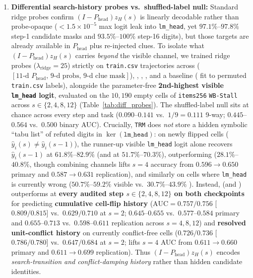 \documentclass[10pt,letterpaper]{article}
\newcommand{\Phead}{P_{\mathrm{head}}}
\begin{document}
\begin{enumerate}[topsep=3pt,itemsep=2pt]
  \item \textbf{Differential search-history probes vs.\ shuffled-label null:} Standard ridge probes confirm $(I-\Phead)z_H(s)$ is linearly decodable rather than probe-opaque ($<1.5\times 10^{-5}$ max logit leak into \texttt{lm\_head}, yet $97.1\%$--$97.8\%$ step-1 candidate masks and $93.5\%$--$100\%$ step-16 digits), but those targets are already available in $\Phead$ plus re-injected clues. To isolate what $(I-\Phead)z_H(s)$ carries \emph{beyond} the visible channel, we trained ridge probes ($\lambda_{\mathrm{ridge}}=25$) strictly on \texttt{train.csv} trajectories across  ($[11\text{-d }\Phead,\, 9\text{-d probs},\, 9\text{-d clue mask}]$), , , , and a  baseline ( fit to permuted \texttt{train.csv} labels), alongside the parameter-free \textbf{2nd-highest visible \texttt{lm\_head} logit}, evaluated on the $10{,}190$ empty cells of \texttt{items256} \texttt{WB-Stall} across $s \in \{2, 4, 8, 12\}$ (Table~\ref{tab:diff_probes}). The shuffled-label null sits at chance across every step and task ($0.090$--$0.141$ vs.\ $1/9=0.111$ 9-way; $0.445$--$0.564$ vs.\ $0.500$ binary AUC). Crucially, \texttt{TRM} does \emph{not} store a hidden symbolic ``tabu list'' of refuted digits in $\ker(\texttt{lm\_head})$: on newly flipped cells ($\hat{y}_i(s) \neq \hat{y}_i(s-1)$), the runner-up visible \texttt{lm\_head} logit alone recovers $\hat{y}_i(s-1)$ at $\mathbf{61.8\%}$--$\mathbf{82.9\%}$ (and  at $51.7\%$--$70.3\%$), outperforming  ($28.1\%$--$40.8\%$, though combining channels lifts $s=4$ accuracy from $0.596 \to 0.650$ primary and $0.587 \to 0.631$ replication), and similarly on cells where \texttt{lm\_head} is currently wrong ($50.7\%$--$59.2\%$ visible vs.\ $30.7\%$--$43.9\%$ ). Instead,  (and ) outperforms  at \textbf{every audited step $s \in \{2,4,8,12\}$ on both checkpoints} for predicting \textbf{cumulative cell-flip history} ($\mathrm{AUC} = 0.757/0.756$ [ $0.809/0.815$] vs.\ $0.629/0.710$ at $s=2$; $0.645$--$0.655$ vs.\ $0.577$--$0.584$ primary and $0.655$--$0.713$ vs.\ $0.598$--$0.611$ replication across $s=4,8,12$) and \textbf{resolved unit-conflict history} on currently conflict-free cells ($0.726/0.736$ [ $0.786/0.780$] vs.\ $0.647/0.684$ at $s=2$;  lifts $s=4$ AUC from $0.611 \to 0.660$ primary and $0.611 \to 0.699$ replication). Thus $(I-\Phead)z_H(s)$ encodes \emph{search-transition and conflict-damping history} rather than hidden candidate identities.
\end{enumerate}
\end{document}
